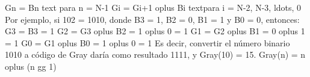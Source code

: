 {}\markdownRendererDollarSign{}G\markdownRendererUnderscore{}n = B\markdownRendererUnderscore{}n \markdownRendererBackslash{}text\markdownRendererLeftBrace{} para \markdownRendererRightBrace{} n = N-1 \markdownRendererDollarSign{} \markdownRendererDollarSign{}G\markdownRendererUnderscore{}i = G\markdownRendererUnderscore{}\markdownRendererLeftBrace{}i+1\markdownRendererRightBrace{} \markdownRendererBackslash{}oplus B\markdownRendererUnderscore{}i \markdownRendererBackslash{}text\markdownRendererLeftBrace{}para \markdownRendererRightBrace{} i = N-2, N-3, \markdownRendererBackslash{}ldots, 0\markdownRendererDollarSign{}\markdownRendererParagraphSeparator
{}Por ejemplo, si \markdownRendererDollarSign{}10\markdownRendererUnderscore{}2 = 1010\markdownRendererDollarSign{}, donde \markdownRendererDollarSign{}B\markdownRendererUnderscore{}3 = 1\markdownRendererDollarSign{}, \markdownRendererDollarSign{}B\markdownRendererUnderscore{}2 = 0\markdownRendererDollarSign{}, \markdownRendererDollarSign{}B\markdownRendererUnderscore{}1 = 1\markdownRendererDollarSign{} y \markdownRendererDollarSign{}B\markdownRendererUnderscore{}0 = 0\markdownRendererDollarSign{}, entonces:\markdownRendererSoftLineBreak
{}\markdownRendererDollarSign{}G\markdownRendererUnderscore{}3 = B\markdownRendererUnderscore{}3 = 1\markdownRendererDollarSign{} \markdownRendererDollarSign{}G\markdownRendererUnderscore{}2 = G\markdownRendererUnderscore{}3 \markdownRendererBackslash{}oplus B\markdownRendererUnderscore{}2 = 1 \markdownRendererBackslash{}oplus 0 = 1\markdownRendererDollarSign{} \markdownRendererDollarSign{}G\markdownRendererUnderscore{}1 = G\markdownRendererUnderscore{}2 \markdownRendererBackslash{}oplus B\markdownRendererUnderscore{}1 = 0 \markdownRendererBackslash{}oplus 1 = 1\markdownRendererDollarSign{} \markdownRendererDollarSign{}G\markdownRendererUnderscore{}0 =\markdownRendererSoftLineBreak
{}G\markdownRendererUnderscore{}1 \markdownRendererBackslash{}oplus B\markdownRendererUnderscore{}0 = 1 \markdownRendererBackslash{}oplus 0 = 1\markdownRendererDollarSign{}\markdownRendererSoftLineBreak
{}Es decir, convertir el número binario \markdownRendererDollarSign{}1010\markdownRendererDollarSign{} a código de Gray daría como resultado \markdownRendererDollarSign{}1111\markdownRendererDollarSign{}, y \markdownRendererDollarSign{}Gray(10) =\markdownRendererSoftLineBreak
{}15\markdownRendererDollarSign{}.\markdownRendererParagraphSeparator
{}\markdownRendererDollarSign{}Gray(n) = n \markdownRendererBackslash{}oplus (n \markdownRendererBackslash{}gg 1)\markdownRendererDollarSign{}\markdownRendererInterblockSeparator
{}
\markdownRendererSectionEnd 
\markdownRendererSectionEnd 
\markdownRendererSectionEnd 
\markdownRendererSectionEnd \markdownRendererDocumentEnd